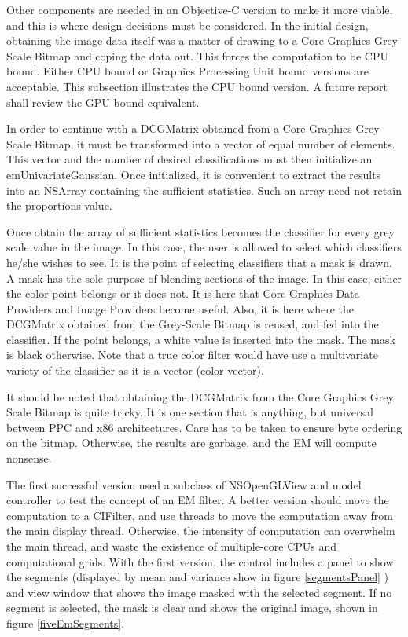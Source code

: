 \documentclass[11pt]{article}
\begin{document}
Other components are needed in an Objective-C version to make it more viable, and this is where design decisions must be considered.   In the initial design, obtaining the image data itself was a matter of drawing to a Core Graphics Grey-Scale Bitmap and coping the data out.   This forces the computation to be CPU bound.  Either CPU bound or Graphics Processing Unit bound versions are acceptable.   This subsection illustrates the CPU bound version.   A future report shall review the GPU bound equivalent.  

In order to continue with a DCGMatrix obtained from a Core Graphics Grey-Scale Bitmap, it must be transformed into a vector of equal number of elements.  This vector and the number of desired classifications must then initialize an emUnivariateGaussian.    Once initialized, it is convenient to extract the results into an NSArray containing the sufficient statistics.  Such an array need not retain the proportions value.  

Once obtain the array of sufficient statistics becomes the classifier for every grey scale value in the image.  In this case, the user is allowed to select which classifiers he/she wishes to see.   It is the point of selecting classifiers that a mask is drawn.  A mask has the sole purpose of blending sections of the image.   In this case, either the color point belongs or it does not.     It is here that Core Graphics Data Providers and Image Providers become useful.   Also, it is here where the DCGMatrix obtained from the Grey-Scale Bitmap is reused, and fed into the classifier.  If the point belongs, a white value is inserted into the mask.  The mask is black otherwise.   Note that a true color filter would have use a multivariate variety of the classifier as it is a vector (color vector).    

It should be noted that obtaining the DCGMatrix from the Core Graphics Grey Scale Bitmap is quite tricky.  It is one section that is anything, but universal between PPC and x86 architectures.   Care has to be taken to ensure byte ordering on the bitmap.  Otherwise, the results are garbage, and the EM will compute nonsense.  

The first successful version used a subclass of NSOpenGLView and model controller to test the concept of an EM filter.  A better version should move the computation to a CIFilter, and use threads to move the computation away from the main display thread.   Otherwise, the intensity of computation can overwhelm the main thread, and waste the existence of multiple-core CPUs and computational grids.   With the first version, the control includes a panel to show the segments (displayed by mean and variance show in figure \ref{segmentsPanel} ) and view window that shows the image masked with the selected segment.  If no segment is selected, the mask is clear and shows the original image, shown in figure \ref{fiveEmSegments}.  
\end{document}
